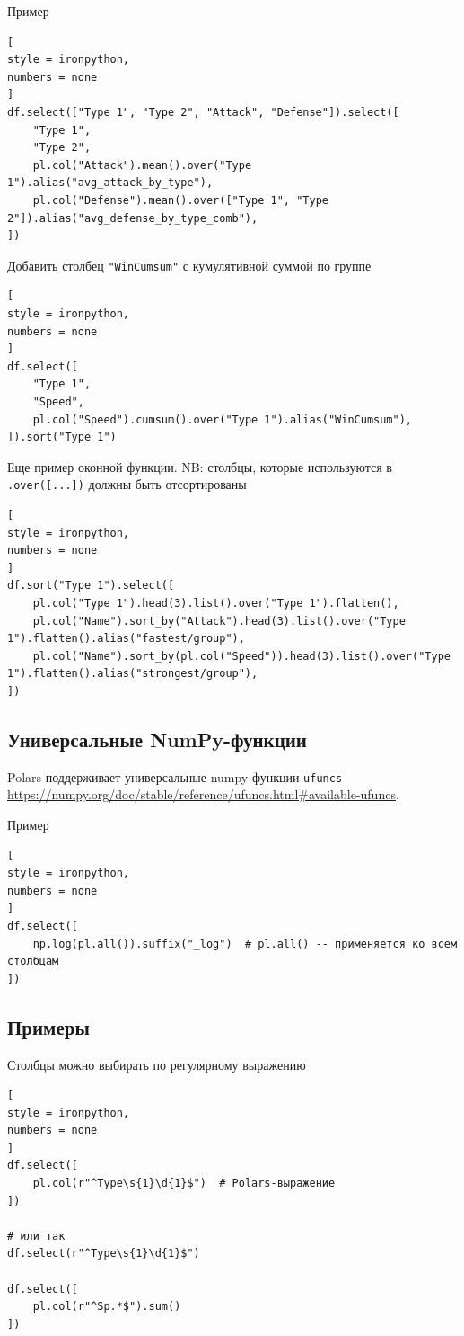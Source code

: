 \documentclass[%
	11pt,
	a4paper,
	utf8,
		]{article}
\begin{document}
Пример
\begin{lstlisting}[
style = ironpython,
numbers = none	
]
df.select(["Type 1", "Type 2", "Attack", "Defense"]).select([
	"Type 1",
	"Type 2",
	pl.col("Attack").mean().over("Type 1").alias("avg_attack_by_type"),
	pl.col("Defense").mean().over(["Type 1", "Type 2"]).alias("avg_defense_by_type_comb"),
])
\end{lstlisting}

Добавить столбец \texttt{"WinCumsum"} с кумулятивной суммой по группе
\begin{lstlisting}[
style = ironpython,
numbers = none	
]
df.select([
    "Type 1",
    "Speed",
    pl.col("Speed").cumsum().over("Type 1").alias("WinCumsum"),
]).sort("Type 1")
\end{lstlisting}

Еще пример оконной функции. NB: столбцы, которые используются в \verb*|.over([...])| должны быть отсортированы
\begin{lstlisting}[
style = ironpython,
numbers = none	
]
df.sort("Type 1").select([
    pl.col("Type 1").head(3).list().over("Type 1").flatten(),
    pl.col("Name").sort_by("Attack").head(3).list().over("Type 1").flatten().alias("fastest/group"),
    pl.col("Name").sort_by(pl.col("Speed")).head(3).list().over("Type 1").flatten().alias("strongest/group"),
])
\end{lstlisting}

\subsection{Универсальные NumPy-функции}

Polars поддерживает универсальные numpy-функции \verb*|ufuncs| \url{https://numpy.org/doc/stable/reference/ufuncs.html#available-ufuncs}.

Пример
\begin{lstlisting}[
style = ironpython,
numbers = none
]
df.select([
    np.log(pl.all()).suffix("_log")  # pl.all() -- применяется ко всем столбцам
])
\end{lstlisting}

\subsection{Примеры}

Столбцы можно выбирать по регулярному выражению
\begin{lstlisting}[
style = ironpython,
numbers = none
]
df.select([
    pl.col(r"^Type\s{1}\d{1}$")  # Polars-выражение
])

# или так
df.select(r"^Type\s{1}\d{1}$")

df.select([
    pl.col(r"^Sp.*$").sum()
])
\end{lstlisting}
\end{document}
